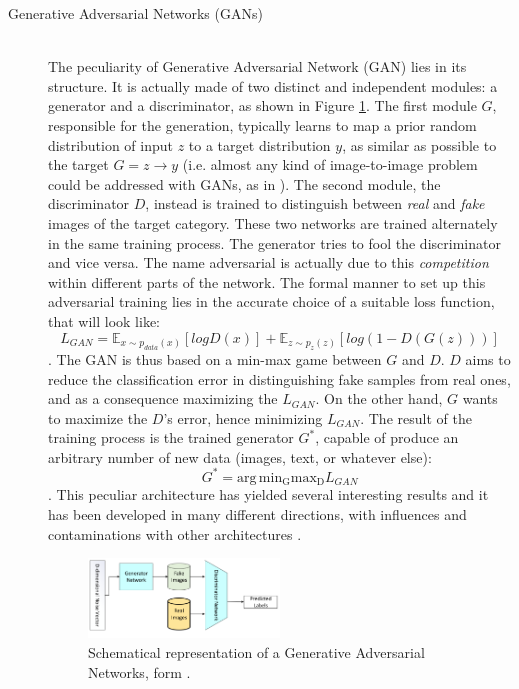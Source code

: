 \documentclass[12pt,a4paper]{report}
\begin{document}
\begin{description}
    \item [Generative Adversarial Networks (GANs)] \hfill \\
        The peculiarity of Generative Adversarial Network (GAN) lies in its structure. It is actually made of two distinct and independent modules: a generator and a discriminator, as shown in Figure \ref{fig:GAN}. The first module $G$, responsible for the generation, typically learns to map a prior random distribution of input $z$ to a target distribution $y$, as similar as possible to the target $G = z \rightarrow y$ (i.e. almost any kind of image-to-image problem could be addressed with GANs, as in \cite{1611.07004}). The second module, the discriminator $D$, instead is trained to distinguish between \textit{real} and \textit{fake} images of the target category. These two networks are trained alternately in the same training process. The generator tries to fool the discriminator and vice versa. The name adversarial is actually due to this \textit{competition} within different parts of the network. The formal manner to set up this adversarial training lies in the accurate choice of a suitable loss function, that will look like: $$L_{GAN} = \mathbb{E}_{x \sim p_{data}(x)}[logD(x)] + \mathbb{E}_{z \sim p_{z}(z)}[log(1-D(G(z)))]$$.
        The GAN is thus based on a min-max game between $G$ and $D$. $D$ aims to reduce the classification error in distinguishing fake samples from real ones, and as a consequence maximizing the $L_{GAN}$. On the other hand, $G$ wants to maximize the $D$'s error, hence minimizing $L_{GAN}$. The result of the training process is the trained generator $G^*$, capable of produce an arbitrary number of new data (images, text, or whatever else): $$ G^* = \operatorname*{arg\,min_Gmax_D} L_{GAN}$$.
        This peculiar architecture has yielded several interesting results and it has been developed in many different directions, with influences and contaminations with other architectures \cite{1611.07004}.

        \begin{figure}
            \centering
            \includegraphics[width = 0.5\textwidth]{images/GAN}
            \caption{Schematical representation of a Generative Adversarial Networks, form \cite{deep_seg_SOA}.}
            \label{fig:GAN}
        \end{figure}


\end{description}
\end{document}

